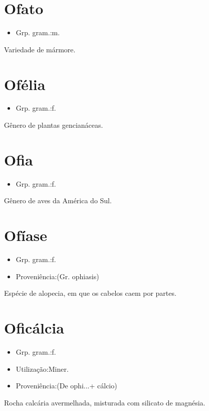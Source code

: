 \section{Ofato}
\begin{itemize}
\item {Grp. gram.:m.}
\end{itemize}
Variedade de mármore.
\section{Ofélia}
\begin{itemize}
\item {Grp. gram.:f.}
\end{itemize}
Gênero de plantas gencianáceas.
\section{Ofia}
\begin{itemize}
\item {Grp. gram.:f.}
\end{itemize}
Gênero de aves da América do Sul.
\section{Ofíase}
\begin{itemize}
\item {Grp. gram.:f.}
\end{itemize}
\begin{itemize}
\item {Proveniência:(Gr. \textunderscore ophiasis\textunderscore )}
\end{itemize}
Espécie de alopecia, em que os cabelos caem por partes.
\section{Oficálcia}
\begin{itemize}
\item {Grp. gram.:f.}
\end{itemize}
\begin{itemize}
\item {Utilização:Miner.}
\end{itemize}
\begin{itemize}
\item {Proveniência:(De \textunderscore ophi...\textunderscore  + \textunderscore cálcio\textunderscore )}
\end{itemize}
Rocha calcária avermelhada, misturada com silicato de magnésia.
